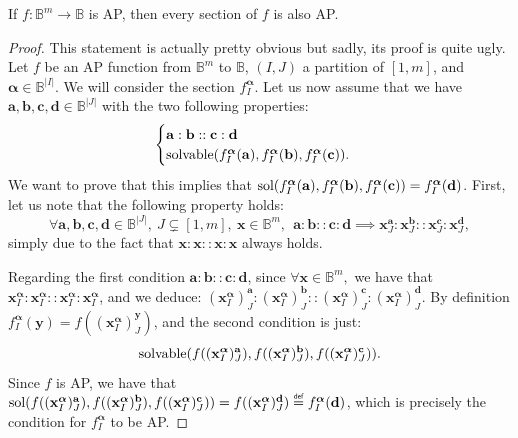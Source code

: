 \begin{property}\label{section_preserve_wap}
If $f\colon \mathbb{B}^m\to \mathbb{B}$ is AP, then every section of $f$ is
  also AP.
\end{property}
\begin{proof}
  This statement is actually pretty obvious but sadly, its proof is quite ugly.
  Let $f$ be an AP function from $\mathbb{B}^m$ to $\mathbb{B}$, $(I,J)$ a
  partition of $[1, m]$, and $\boldsymbol{\alpha} \in \mathbb{B}^{|I|}$. We
  will consider the section  $f^{\boldsymbol{\alpha}}_I$.  Let us now assume
  that we have $\mathbf{a},\mathbf{b},\mathbf{c}, \mathbf{d} \in
  \mathbb{B}^{|J|}$ with the two following properties:
  $$
  \begin{cases}
    \mathbf{a}:\mathbf{b}::\mathbf{c}:\mathbf{d}\\
    \text{solvable}(f^{\boldsymbol{\alpha}}_I(\mathbf{a}),
    f^{\boldsymbol{\alpha}}_I(\mathbf{b}),
    f^{\boldsymbol{\alpha}}_I(\mathbf{c})).
  \end{cases}
  $$
  We want to prove that this implies that
  $\text{sol}(f^{\boldsymbol{\alpha}}_I(\mathbf{a}),
  f^{\boldsymbol{\alpha}}_I(\mathbf{b}), 
  f^{\boldsymbol{\alpha}}_I(\mathbf{c}))
  =
  f^{\boldsymbol{\alpha}}_I(\mathbf{d})$.
  First, let us note that the following property holds:
$$\forall \mathbf{a},\mathbf{b},\mathbf{c}, \mathbf{d} \in \mathbb{B}^{|J|},~J
  \subsetneq [1,m], ~ \mathbf{x} \in \mathbb{B}^m,~~ \mathbf{a}: \mathbf{b} ::
  \mathbf{c} : \mathbf{d} \implies \mathbf{x}^{\mathbf{a}}_J :
  \mathbf{x}^{\mathbf{b}}_J:: \mathbf{x}^{\mathbf{c}}_J :
  \mathbf{x}^{\mathbf{d}}_J,$$
  simply due to the fact that $\mathbf{x}:\mathbf{x}::\mathbf{x}:\mathbf{x}$
  always holds.

Regarding the first condition $\mathbf{a}:\mathbf{b}::\mathbf{c}:\mathbf{d}$,
since $\forall \mathbf{x} \in \mathbb{B}^m,$ we have that $
  \mathbf{x}^{\boldsymbol{\alpha}}_I : \mathbf{x}^{\boldsymbol{\alpha}}_I ::
  \mathbf{x}^{\boldsymbol{\alpha}}_I : \mathbf{x}^{\boldsymbol{\alpha}}_I$,
  and we
  deduce: $(\mathbf{x}^{\boldsymbol{\alpha}}_I)^{\mathbf{a}}_J :
  (\mathbf{x}^{\boldsymbol{\alpha}}_I)^{\mathbf{b}}_J ::
  (\mathbf{x}^{\boldsymbol{\alpha}}_I)^{\mathbf{c}}_J :
  (\mathbf{x}^{\boldsymbol{\alpha}}_I)^{\mathbf{d}}_J$.
By definition $f^{\boldsymbol{\boldsymbol{\alpha}}}_I(\mathbf{y}) =
  f((\mathbf{x}^{\boldsymbol{\alpha}}_I)^{\mathbf{y}}_J)$, and the second
  condition is just:
  $$\text{solvable}(f((\mathbf{x}^{\boldsymbol{\alpha}}_I)^\mathbf{a}_J),
  f((\mathbf{x}^{\boldsymbol{\alpha}}_I)^\mathbf{b}_J),
  f((\mathbf{x}^{\boldsymbol{\alpha}}_I)^\mathbf{c}_J)).$$
  Since $f$ is AP, we have that
  $\sol(f((\mathbf{x}^{\boldsymbol{\alpha}}_I)^\mathbf{a}_J),
  f((\mathbf{x}^{\boldsymbol{\alpha}}_I)^\mathbf{b}_J),
  f((\mathbf{x}^{\boldsymbol{\alpha}}_I)^\mathbf{c}_J))=
  f((\mathbf{x}^{\boldsymbol{\alpha}}_I)^\mathbf{d}_J) \eqdef
  f^{\boldsymbol{\alpha}}_I(\mathbf{d})$,
  which is precisely the condition for
  $f^{\boldsymbol{\boldsymbol{\alpha}}}_I$ to be AP.
\end{proof}


